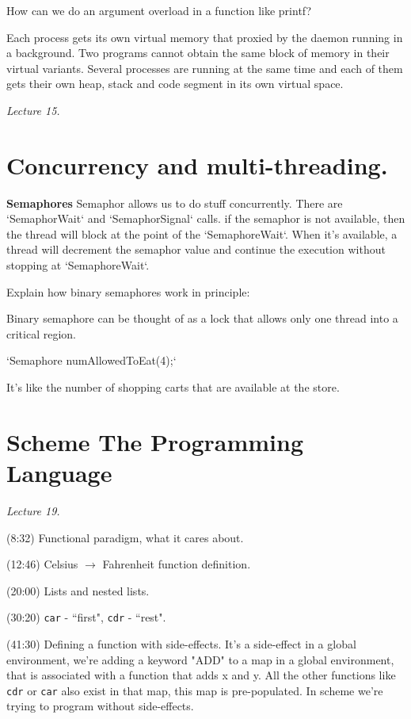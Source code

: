 How can we do an argument overload in a function like printf?

Each process gets its own virtual memory that proxied by the daemon running in
a background. Two programs cannot obtain the same block of memory in their
virtual variants. Several processes are running at the same time and each of
them gets their own heap, stack and code segment in its own virtual space.

\textit{Lecture 15.}

\section{Concurrency and multi-threading.}

\textbf{Semaphores}
Semaphor allows us to do stuff concurrently.
There are `SemaphorWait` and `SemaphorSignal` calls. if the semaphor is not
available, then the thread will block at the point of the `SemaphoreWait`. When
it's available, a thread will decrement the semaphor value and continue the
execution without stopping at `SemaphoreWait`.

Explain how binary semaphores work in principle:

Binary semaphore can be thought of as a lock that allows only one thread into a
critical region.

`Semaphore numAllowedToEat(4);`

It's like the number of shopping carts that are available at the store.

\section{Scheme The Programming Language}%
\label{sec:scheme_the_programming_language}
\textit{Lecture 19.}

(8:32) Functional paradigm, what it cares about.

(12:46) Celsius $\longrightarrow$ Fahrenheit function definition.

(20:00) Lists and nested lists.

(30:20) \verb!car! - ``first", \verb!cdr! - ``rest".

(41:30) Defining a function with side-effects. It's a side-effect
in a global environment, we're adding a keyword "ADD" to a map in a global
environment, that is associated with a function that adds x and y. All the
other functions like \verb!cdr! or \verb!car! also exist in that map, this map
is pre-populated. In scheme we're trying to program without side-effects.

